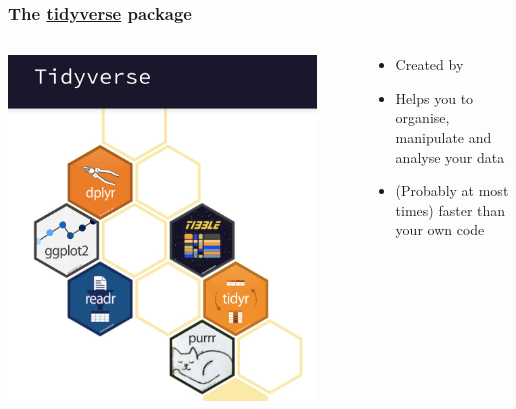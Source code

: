 \documentclass{beamer}
\begin{document}
\begin{frame}
\frametitle{The \href{https://www.tidyverse.org}{tidyverse} package}
\begin{columns}
\begin{center}
\includegraphics[width=0.9\textwidth]{tidy.jpg}
\end{center}
\begin{center}
\begin{itemize}
\item Created by {}
\item Helps you to organise, manipulate and analyse your data
\item (Probably at most times) faster than your own code 
\end{itemize}
\end{center}
\end{columns}
\end{frame}
\end{document}
